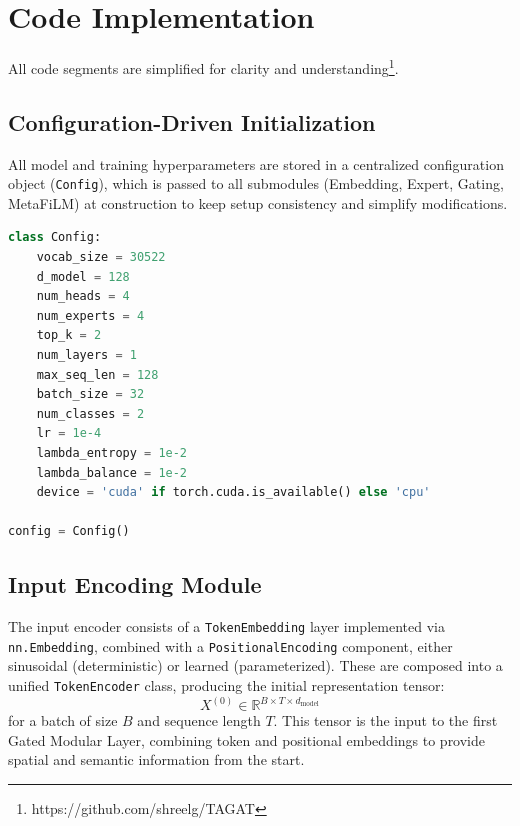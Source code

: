 \documentclass{article}
\begin{document}
\section{Code Implementation}

All code segments are simplified for clarity and understanding\footnote{https://github.com/shreelg/TAGAT}. 

\subsection{Configuration-Driven Initialization}


All model and training hyperparameters are stored in a centralized configuration object (\texttt{Config}), which is passed to all submodules (Embedding, Expert, Gating, MetaFiLM) at construction to keep setup consistency and simplify modifications.
\vspace{3pt}

\begin{lstlisting}[language=Python, caption={ \texttt{Config} object (Specific parameter values may vary per experiment)}, label={lst:config}]
class Config:
    vocab_size = 30522
    d_model = 128
    num_heads = 4
    num_experts = 4
    top_k = 2
    num_layers = 1
    max_seq_len = 128
    batch_size = 32
    num_classes = 2
    lr = 1e-4
    lambda_entropy = 1e-2
    lambda_balance = 1e-2
    device = 'cuda' if torch.cuda.is_available() else 'cpu'

config = Config()
\end{lstlisting}



\subsection{Input Encoding Module}
The input encoder consists of a \texttt{TokenEmbedding} layer implemented via \texttt{nn.Embedding}, combined with a \texttt{PositionalEncoding} component, either sinusoidal (deterministic) or learned (parameterized). These are composed into a unified \texttt{TokenEncoder} class, producing the initial representation tensor:
\[
X^{(0)} \in \mathbb{R}^{B \times T \times d_{\mathrm{model}}}
\]
for a batch of size $B$ and sequence length $T$.
This tensor is the input to the first Gated Modular Layer, combining token and positional embeddings to provide spatial and semantic information from the start.
\vspace{3pt}
\end{document}
